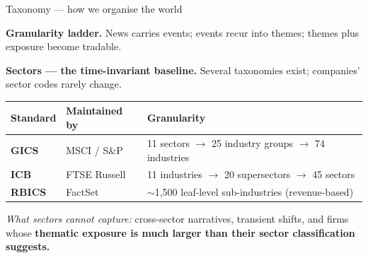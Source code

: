 \documentclass[10pt,aspectratio=169]{beamer}
\begin{document}
\begin{frame}{Taxonomy --- how we organise the world}
  \footnotesize

  \textbf{Granularity ladder.}\;
  News carries events; events recur into themes; themes plus exposure
  become tradable.

  \vspace{0.10cm}
  \begin{center}
  \end{center}

  \vspace{0.20cm}
  \textbf{Sectors --- the time-invariant baseline.}\;
  Several taxonomies exist; companies' sector codes rarely change.

  \vspace{0.10cm}
  \begin{center}
  \begin{tabular}{@{}lll@{}}
    \toprule
    Standard & Maintained by & Granularity \\
    \midrule
    \textbf{GICS}  & MSCI / S\&P    & 11 sectors $\rightarrow$ 25 industry groups $\rightarrow$ 74 industries \\
    \textbf{ICB}   & FTSE Russell   & 11 industries $\rightarrow$ 20 supersectors $\rightarrow$ 45 sectors \\
    \textbf{RBICS} & FactSet        & $\sim$1{,}500 leaf-level sub-industries (revenue-based) \\
    \bottomrule
  \end{tabular}
  \end{center}

  \vspace{0.15cm}
  \textit{What sectors cannot capture:} cross-sector narratives, transient
  shifts, and firms whose \textbf{thematic exposure is much larger than
  their sector classification suggests.}

\end{frame}
\end{document}
